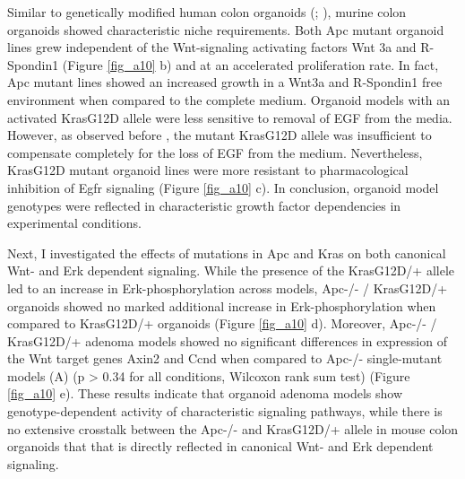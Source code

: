 \begin{flushleft}
Similar to genetically modified human colon organoids (\citet{Drost2015-ph}; \citet{Matano2015-zw}), murine colon organoids showed characteristic niche requirements. Both Apc mutant organoid lines grew independent of the Wnt-signaling activating factors Wnt 3a and R-Spondin1 (Figure \ref{fig_a10} b) and at an accelerated proliferation rate. In fact, Apc mutant lines showed an increased growth in a Wnt3a and R-Spondin1 free environment when compared to the complete medium. Organoid models with an activated KrasG12D allele were less sensitive to removal of EGF from the media. However, as observed before \citep{Drost2015-ph}, the mutant KrasG12D allele was insufficient to compensate completely for the loss of EGF from the medium. Nevertheless, KrasG12D mutant organoid lines were more resistant to pharmacological inhibition of Egfr signaling (Figure \ref{fig_a10} c). In conclusion, organoid model genotypes were reflected in characteristic growth factor dependencies in experimental conditions.

\bigbreak
Next, I investigated the effects of mutations in Apc and Kras on both canonical Wnt- and Erk dependent signaling. While the presence of the KrasG12D/+ allele led to an increase in Erk-phosphorylation across models, Apc-/- / KrasG12D/+ organoids showed no marked additional increase in Erk-phosphorylation when compared to KrasG12D/+ organoids (Figure \ref{fig_a10} d). Moreover, Apc-/- / KrasG12D/+ adenoma models showed no significant differences in expression of the Wnt target genes Axin2 and Ccnd when compared to Apc-/- single-mutant models (A) (p > 0.34 for all conditions, Wilcoxon rank sum test) (Figure \ref{fig_a10} e). These results indicate that organoid adenoma models show genotype-dependent activity of characteristic signaling pathways, while there is no extensive crosstalk between the Apc-/-  and KrasG12D/+ allele in mouse colon organoids that that is directly reflected in canonical Wnt- and Erk dependent signaling.  

\bigbreak

\end{flushleft}
